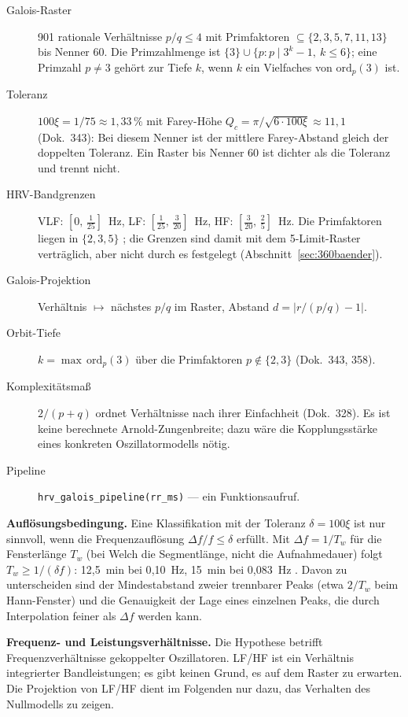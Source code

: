 \begin{description}
\item[Galois-Raster] 901 rationale Verhältnisse $p/q\le4$ mit Primfaktoren
  $\subseteq\{2,3,5,7,11,13\}$ bis Nenner 60. Die Primzahlmenge ist
  $\{3\}\cup\{p : p\mid 3^k-1,\ k\le6\}$; eine Primzahl $p\neq3$ gehört zur
  Tiefe $k$, wenn $k$ ein Vielfaches von $\mathrm{ord}_p(3)$ ist.
\item[Toleranz] $100\xi = 1/75 \approx 1{,}33\,\%$ mit Farey-Höhe
  $Q_c=\pi/\sqrt{6\cdot100\xi}\approx11{,}1$ (Dok.~343): Bei diesem Nenner
  ist der mittlere Farey-Abstand gleich der doppelten Toleranz. Ein Raster
  bis Nenner 60 ist dichter als die Toleranz und trennt nicht.
\item[HRV-Bandgrenzen] VLF: $[0,\,\tfrac{1}{25}]$~Hz, LF: $[\tfrac{1}{25},\,\tfrac{3}{20}]$~Hz,
  HF: $[\tfrac{3}{20},\,\tfrac{2}{5}]$~Hz. Die Primfaktoren liegen in
  $\{2,3,5\}$ \BM; die Grenzen sind damit mit dem 5-Limit-Raster verträglich,
  aber nicht durch es festgelegt (Abschnitt~\ref{sec:360baender}).
\item[Galois-Projektion] Verhältnis $\mapsto$ nächstes $p/q$ im Raster,
  Abstand $d=|r/(p/q)-1|$.
\item[Orbit-Tiefe] $k=\max\,\mathrm{ord}_p(3)$ über die Primfaktoren
  $p\notin\{2,3\}$ (Dok.~343, 358).
\item[Komplexitätsmaß] $2/(p+q)$ ordnet Verhältnisse nach ihrer
  Einfachheit (Dok.~328). Es ist keine berechnete Arnold-Zungenbreite;
  dazu wäre die Kopplungsstärke eines konkreten Oszillatormodells nötig.
\item[Pipeline] \texttt{hrv\_galois\_pipeline(rr\_ms)} --- ein Funktionsaufruf.
\end{description}

\textbf{Auflösungsbedingung.} Eine Klassifikation mit der Toleranz
$\delta=100\xi$ ist nur sinnvoll, wenn die Frequenzauflösung
$\Delta f/f\le\delta$ erfüllt. Mit $\Delta f=1/T_w$ für die Fensterlänge
$T_w$ (bei Welch die Segmentlänge, nicht die Aufnahmedauer) folgt
$T_w\ge1/(\delta f)$: 12{,}5~min bei 0{,}10~Hz, 15~min bei 0{,}083~Hz \BM.
Davon zu unterscheiden sind der Mindestabstand zweier trennbarer Peaks
(etwa $2/T_w$ beim Hann-Fenster) und die Genauigkeit der Lage eines
einzelnen Peaks, die durch Interpolation feiner als $\Delta f$ werden kann.

\textbf{Frequenz- und Leistungsverhältnisse.} Die Hypothese betrifft
Frequenzverhältnisse gekoppelter Oszillatoren. LF/HF ist ein Verhältnis
integrierter Bandleistungen; es gibt keinen Grund, es auf dem Raster zu
erwarten. Die Projektion von LF/HF dient im Folgenden nur dazu, das
Verhalten des Nullmodells zu zeigen.


